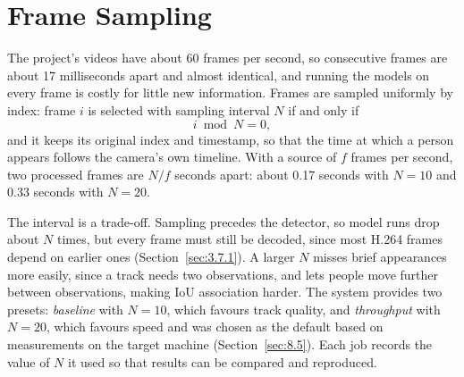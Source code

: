 \section{Frame Sampling}
\label{sec:3.4}
\label{sec:3.4.3}

The project's videos have about 60 frames per second, so consecutive frames are about 17 milliseconds apart and almost identical, and running the models on every frame is costly for little new information. Frames are sampled uniformly by index: frame $i$ is selected with sampling interval $N$ if and only if
\begin{equation}
    i \bmod N = 0,
    \label{eq:sampling}
\end{equation}
and it keeps its original index and timestamp, so that the time at which a person appears follows the camera's own timeline. With a source of $f$ frames per second, two processed frames are $N/f$ seconds apart: about 0.17 seconds with $N = 10$ and 0.33 seconds with $N = 20$.

The interval is a trade-off. Sampling precedes the detector, so model runs drop about $N$ times, but every frame must still be decoded, since most H.264 frames depend on earlier ones (Section~\ref{sec:3.7.1}). A larger $N$ misses brief appearances more easily, since a track needs two observations, and lets people move further between observations, making IoU association harder. The system provides two presets: \emph{baseline} with $N = 10$, which favours track quality, and \emph{throughput} with $N = 20$, which favours speed and was chosen as the default based on measurements on the target machine (Section~\ref{sec:8.5}). Each job records the value of $N$ it used so that results can be compared and reproduced.
